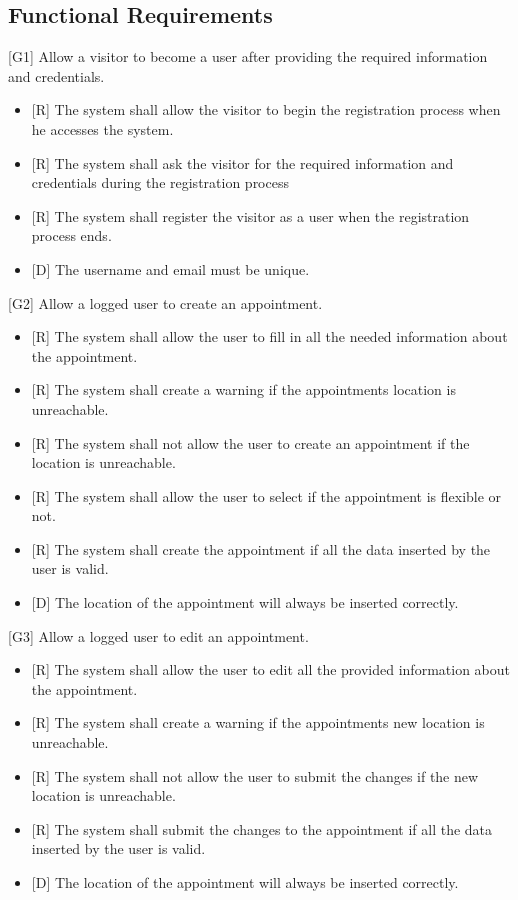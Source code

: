 \documentclass[12pt]{article}
\begin{document}
\subsection{Functional Requirements}

{[G1]} Allow a visitor to become a user after providing the required information and credentials.
\begin{itemize}
    \item{[R]} The system shall allow the visitor to begin the registration process when he accesses the system. 
    \item{[R]} The system shall ask the visitor for the required information and credentials during the registration process
    \item{[R]} The system shall register the visitor as a user when the registration process ends.
    \item {[D]} The username and email must be unique.
\end{itemize}
{[G2]} Allow a logged user to create an appointment.
\begin{itemize}
    \item{[R]} The system shall allow the user to fill in all the needed information about the appointment.
    \item{[R]} The system shall create a warning if the appointments location is unreachable.
    \item{[R]} The system shall not allow the user to create an appointment if the location is unreachable.
    \item{[R]} The system shall allow the user to select if the appointment is flexible or not.
    \item{[R]} The system shall create the appointment if all the data inserted by the user is valid.
    \item {[D]} The location of the appointment will always be inserted correctly.
\end{itemize}
{[G3]} Allow a logged user to edit an appointment.
\begin{itemize}
    \item{[R]} The system shall allow the user to edit all the provided information about the appointment.
    \item{[R]} The system shall create a warning if the appointments new location is unreachable.
    \item{[R]} The system shall not allow the user to submit the changes if the new location is unreachable.
    \item{[R]} The system shall submit the changes to the appointment if all the data inserted by the user is valid.
    \item {[D]} The location of the appointment will always be inserted correctly.
\end{itemize}
\end{document}
